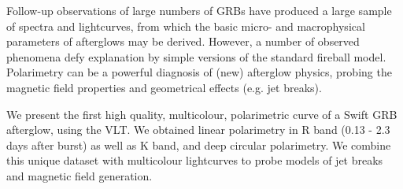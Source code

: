 


\bigskip



\bigskip

\noindent Follow-up observations of large numbers of GRBs have produced a large sample of spectra and lightcurves, from which the basic micro- and macrophysical parameters of afterglows may be derived. However, a number of observed phenomena defy explanation by simple versions of the standard fireball model. Polarimetry can be a powerful diagnosis of (new) afterglow physics, probing the magnetic field properties and geometrical effects (e.g. jet breaks). 

We present the first high quality, multicolour, polarimetric curve of a Swift GRB afterglow, using the VLT. We obtained linear polarimetry in R band (0.13 - 2.3 days after burst) as well as K band, and deep circular polarimetry. We combine this unique dataset with multicolour lightcurves to probe models of jet breaks and magnetic field generation.
